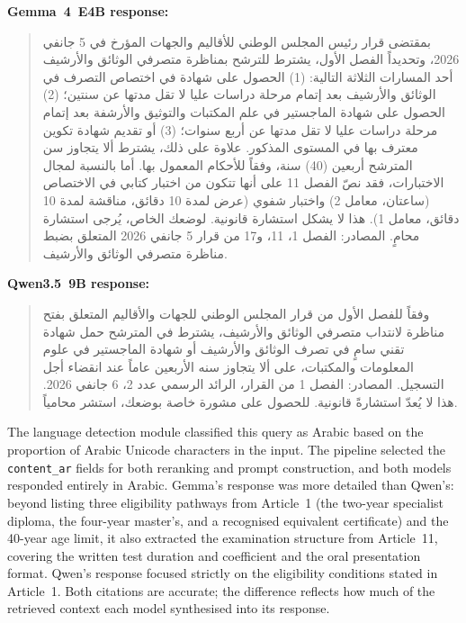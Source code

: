 \vspace{0.5em}

\noindent\textbf{Gemma~4~E4B response:}

\begin{quote}
\textarabic{بمقتضى قرار رئيس المجلس الوطني للأقاليم والجهات المؤرخ في 5 جانفي 2026، وتحديداً الفصل الأول، يشترط للترشح بمناظرة متصرفي الوثائق والأرشيف أحد المسارات الثلاثة التالية: (1) الحصول على شهادة في اختصاص التصرف في الوثائق والأرشيف بعد إتمام مرحلة دراسات عليا لا تقل مدتها عن سنتين؛ (2) الحصول على شهادة الماجستير في علم المكتبات والتوثيق والأرشفة بعد إتمام مرحلة دراسات عليا لا تقل مدتها عن أربع سنوات؛ (3) أو تقديم شهادة تكوين معترف بها في المستوى المذكور. علاوة على ذلك، يشترط ألا يتجاوز سن المترشح أربعين (40) سنة، وفقاً للأحكام المعمول بها. أما بالنسبة لمجال الاختبارات، فقد نصّ الفصل 11 على أنها تتكون من اختبار كتابي في الاختصاص (ساعتان، معامل 2) واختبار شفوي (عرض لمدة 10 دقائق، مناقشة لمدة 10 دقائق، معامل 1). هذا لا يشكل استشارة قانونية. لوضعك الخاص، يُرجى استشارة محامٍ. المصادر: الفصل 1، 11، و17 من قرار 5 جانفي 2026 المتعلق بضبط مناظرة متصرفي الوثائق والأرشيف.}
\end{quote}

\noindent\textbf{Qwen3.5~9B response:}

\begin{quote}
\textarabic{وفقاً للفصل الأول من قرار المجلس الوطني للجهات والأقاليم المتعلق بفتح مناظرة لانتداب متصرفي الوثائق والأرشيف، يشترط في المترشح حمل شهادة تقني سامٍ في تصرف الوثائق والأرشيف أو شهادة الماجستير في علوم المعلومات والمكتبات، على ألا يتجاوز سنه الأربعين عاماً عند انقضاء أجل التسجيل. المصادر: الفصل 1 من القرار، الرائد الرسمي عدد 2، 6 جانفي 2026. هذا لا يُعدّ استشارةً قانونية. للحصول على مشورة خاصة بوضعك، استشر محامياً.}
\end{quote}

The language detection module classified this query as Arabic based on the proportion of Arabic Unicode characters in the input. The pipeline selected the \texttt{content\_ar} fields for both reranking and prompt construction, and both models responded entirely in Arabic. Gemma's response was more detailed than Qwen's: beyond listing three eligibility pathways from Article~1 (the two-year specialist diploma, the four-year master's, and a recognised equivalent certificate) and the 40-year age limit, it also extracted the examination structure from Article~11, covering the written test duration and coefficient and the oral presentation format. Qwen's response focused strictly on the eligibility conditions stated in Article~1. Both citations are accurate; the difference reflects how much of the retrieved context each model synthesised into its response.

